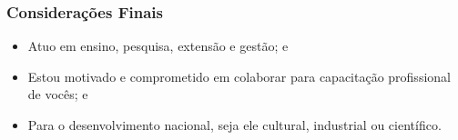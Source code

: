 \documentclass[aspectratio=169]{beamer}
\begin{document}
\begin{frame}
	\frametitle{Considerações Finais}

	\begin{itemize}
		\item Atuo em ensino, pesquisa, extensão e gestão; e
		\item Estou motivado e comprometido em colaborar para capacitação
		profissional de vocês; e
		\item Para o desenvolvimento nacional, seja ele cultural, industrial ou científico.
	\end{itemize}
\end{frame}
\end{document}
